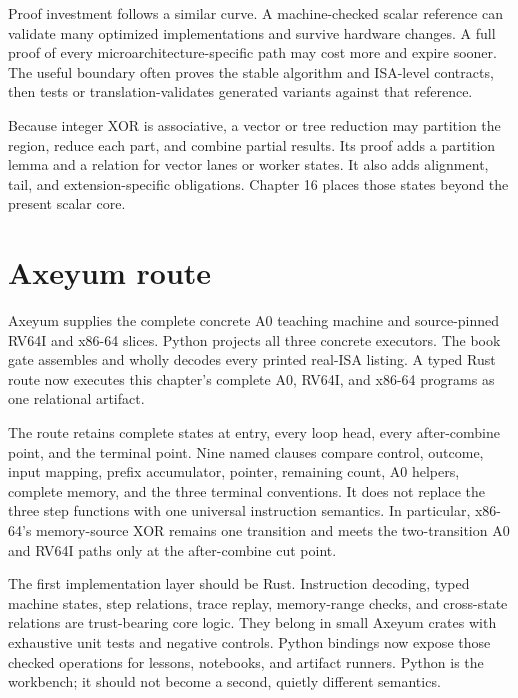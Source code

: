 Proof investment follows a similar curve. A machine-checked scalar reference
can validate many optimized implementations and survive hardware changes. A
full proof of every microarchitecture-specific path may cost more and expire
sooner. The useful boundary often proves the stable algorithm and ISA-level
contracts, then tests or translation-validates generated variants against that
reference.

\begin{goingdeeper}[title={The scalar proof prepares a parallel proof}]
Because integer XOR is associative, a vector or tree reduction may partition
the region, reduce each part, and combine partial results. Its proof adds a
partition lemma and a relation for vector lanes or worker states. It also adds
alignment, tail, and extension-specific obligations. Chapter 16 places those
states beyond the present scalar core.
\end{goingdeeper}

\section{Axeyum route}

Axeyum supplies the complete concrete A0 teaching machine and source-pinned
RV64I and x86-64 slices. Python projects all three concrete executors. The book
gate assembles and wholly decodes every printed real-ISA listing. A typed Rust
route now executes this chapter's complete A0, RV64I, and x86-64 programs as
one relational artifact.

The route retains complete states at entry, every loop head, every
after-combine point, and the terminal point. Nine named clauses compare
control, outcome, input mapping, prefix accumulator, pointer, remaining count,
A0 helpers, complete memory, and the three terminal conventions. It does not
replace the three step functions with one universal instruction semantics.
In particular, x86-64's memory-source XOR remains one transition and meets
the two-transition A0 and RV64I paths only at the after-combine cut point.

The first implementation layer should be Rust. Instruction decoding, typed
machine states, step relations, trace replay, memory-range checks, and
cross-state relations are trust-bearing core logic. They belong in small
Axeyum crates with exhaustive unit tests and negative controls. Python bindings
now expose those checked operations for lessons, notebooks, and
artifact runners. Python is the workbench; it should not become a second,
quietly different semantics.

